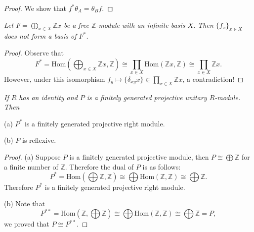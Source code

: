 \begin{proof}
We show that $f^*\theta_A=\theta_Bf$. 
\end{proof}
\begin{problem}\em
Let $F=\bigoplus_{x\in X}\mathbb{Z}x$ be a free $\mathbb{Z}$-module with an infinite basis $X$. Then $\{f_x\}_{x\in X}$ does not form a basis of $F^*$.
\end{problem}
\begin{proof}
Observe that 
$$
F^*=\mathrm{Hom}\left( \bigoplus_{x\in X}{\mathbb{Z} x},\mathbb{Z} \right) \cong \prod_{x\in X}{\mathrm{Hom}\left( \mathbb{Z} x,\mathbb{Z} \right)}\cong \prod_{x\in X}{\mathbb{Z} x}.
$$
However, under this isomorphism $f_y\mapsto\{\delta_{xy}x\}\in\prod_{x\in X}\mathbb{Z}x$, a contradiction!
\end{proof}
\begin{problem}\em
If $R$ has an identity and $P$ is a finitely generated projective unitary $R$-module. Then \par
(a) $P^*$ is a finitely generated projective right module.\par
(b) $P$ is reflexive.
\end{problem}
\begin{proof}
(a) Suppose $P$ is a finitely generated projective module, then $P\cong\bigoplus\mathbb{Z}$ for a finite number of $\mathbb{Z}$. Therefore the dual of $P$ is as follows: 
$$
P^*=\mathrm{Hom}\left( \bigoplus{\mathbb{Z}},\mathbb{Z} \right) \cong \bigoplus{\mathrm{Hom}\left( \mathbb{Z} ,\mathbb{Z} \right)}\cong \bigoplus{\mathbb{Z}}.
$$
Therefore $P^*$ is a finitely generated projective right module.\par
(b) Note that 
$$
P^{**}=\mathrm{Hom}\left( \mathbb{Z} ,\bigoplus{\mathbb{Z}} \right) \cong \bigoplus{\mathrm{Hom}\left( \mathbb{Z} ,\mathbb{Z} \right)}\cong \bigoplus{\mathbb{Z}}=P,
$$
we proved that $P\cong P^{**}$.
\end{proof}
